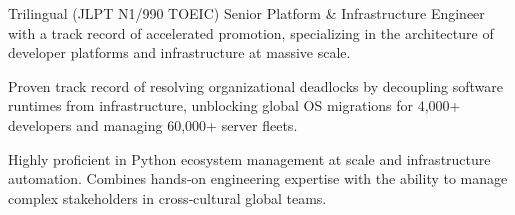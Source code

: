 

\begin{cvparagraph}

Trilingual (JLPT N1/990 TOEIC) Senior Platform \& Infrastructure Engineer with a track record of accelerated promotion, specializing in the architecture of developer platforms and infrastructure at massive scale.

Proven track record of resolving organizational deadlocks by decoupling software runtimes from infrastructure, unblocking global OS migrations for 4,000+ developers and managing 60,000+ server fleets.

Highly proficient in Python ecosystem management at scale and infrastructure automation.
Combines hands‑on engineering expertise with the ability to manage complex stakeholders in cross‑cultural global teams.
\end{cvparagraph}
